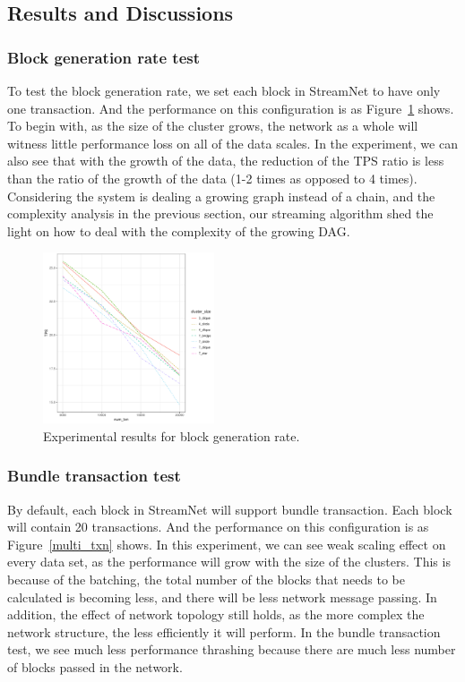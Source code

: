 \subsection {Results and Discussions}

\subsubsection {Block generation rate test}
To test the block generation rate, we set each block in StreamNet to have only one transaction.
And the performance on this configuration is as Figure~\ref{single_txn} shows.
To begin with, as the size of the cluster grows, the network as a whole will witness little performance loss on all of the data scales. 
In the experiment, we can also see that with the growth of the data, the reduction of the TPS ratio is less than the ratio of the growth of the data (1-2 times as opposed to 4 times).
Considering the system is dealing a growing graph instead of a chain, and the complexity analysis in the previous section,
our streaming algorithm shed the light on how to deal with the complexity of the growing DAG.

\begin{figure}[!ht]
\begin{center}
\includegraphics[height=0.35\textwidth, width=0.45\textwidth]{figures/single_txn.pdf}
    \caption{
        Experimental results for block generation rate.
     }
\label{single_txn}
\end{center}
\end{figure}



\subsubsection {Bundle transaction test}

By default, each block in StreamNet will support bundle transaction. 
Each block will contain 20 transactions.
And the performance on this configuration is as Figure~\ref{multi_txn} shows.
In this experiment, we can see weak scaling effect on every data set, as the performance will grow with the size of the clusters.
This is because of the batching, the total number of the blocks that needs to be calculated is becoming less, and there will be less network message passing.
In addition, the effect of network topology still holds, as the more complex the network structure, the less efficiently it will perform.
In the bundle transaction test, we see much less performance thrashing because there are much less number of blocks passed in the network. 

